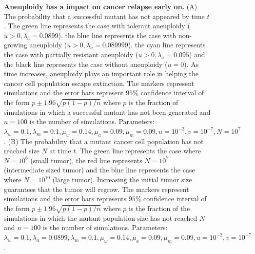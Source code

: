 \documentclass[12pt]{extarticle}
\begin{document}
\begin{figure}
\begin{subfigure}{0.5\textwidth}
\end{subfigure}
\caption{\textbf{Aneuploidy has a impact on cancer relapse early on.}
(A) The probability that a successful mutant has not appeared by time $t$. The green line represents the case with tolerant aneuploidy ($u>0, \lambda_a=0.0899$), the blue line represents the case with non-growing aneuploidy ($u>0, \lambda_a=0.089999$), the cyan line represents the case with partially resistant aneuploidy ($u>0, \lambda_a=0.095$) and the black line represents the case without aneuploidy ($u=0$).  As time increases, aneuploidy plays an important role in helping the cancer cell population escape extinction. The markers represent simulations and the error bars represent $95\%$ confidence interval of the form $p\pm1.96\sqrt{p\left(1-p\right)/n}$ where $p$ is the fraction of simulations in which a successful mutant has not been generated and $n=100$ is the number of simulations. Parameters: $\lambda_w=0.1,\lambda_m=0.1,\mu_w=0.14,\mu_a=0.09,\mu_m=0.09, u=10^{-2}, v=10^{-7},N=10^7$.
(B) The probability that a mutant cancer cell population has not reached size $N$ at time $t$. The green line represents the case where $N=10^6$ (small tumor), the red line represents $N=10^7$ (intermediate sized tumor) and the blue line represents the case where $N=10^{10}$ (large tumor). Increasing the initial tumor size guarantees that the tumor will regrow. The markers represent simulations and the error bars represents $95\%$ confidence interval of the form $p\pm1.96\sqrt{p\left(1-p\right)/n}$ where $p$ is the fraction of the simulations in which the mutant population size has not reached $N$ and $n=100$ is the number of simulations.
Parameters: $\lambda_w=0.1,\lambda_a=0.0899,\lambda_m=0.1,\mu_w=0.14,\mu_a=0.09,\mu_m=0.09, u=10^{-2}, v=10^{-7}$.}
\label{cdffig}
\end{figure}

\end{document}
